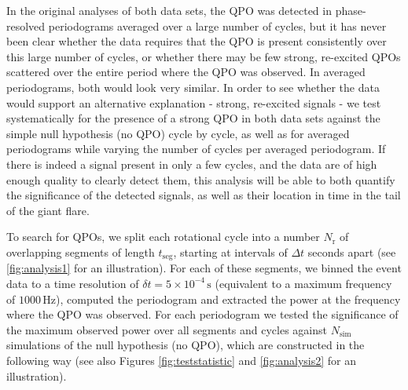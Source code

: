 \documentclass{emulateapj}
\begin{document}
In the original analyses of both data sets, the QPO was detected in phase-resolved periodograms averaged over a large number of cycles, but it has never been clear whether the data requires that the QPO is present consistently over this large number of cycles, or whether there may be few strong, re-excited QPOs scattered over the entire period where the QPO was observed. In averaged periodograms, both would look very similar.
In order to see whether the data would support an alternative explanation - strong, re-excited signals - we test systematically for the presence of a strong QPO in both data sets against the simple null hypothesis (no QPO) cycle by cycle, as well as for averaged periodograms while varying the number of cycles per averaged periodogram. If there is indeed a signal present in only a few cycles, and the data are of high enough quality to clearly detect them, this analysis will be able to both quantify the significance of the detected signals, as well as their location in time in the tail of the giant flare.



To search for QPOs, we split each rotational cycle into a number $N_\mathrm{r}$ of overlapping segments of length $t_{\mathrm{seg}}$, starting at intervals of $\Delta t$ seconds apart (see \ref{fig:analysis1} for an illustration). For each of these segments, we binned the event data to a time resolution of $\delta t = 5 \times10^{-4} \, \mathrm{s}$ (equivalent to a maximum frequency of $1000 \, \mathrm{Hz}$), computed the periodogram and extracted the power at the frequency where the QPO was observed. For each periodogram we tested the significance of the maximum observed power over all segments and cycles against $N_{\mathrm{sim}}$ simulations of the null hypothesis (no QPO), which are constructed in the following way (see also Figures \ref{fig:teststatistic} and \ref{fig:analysis2} for an illustration).
\end{document}
